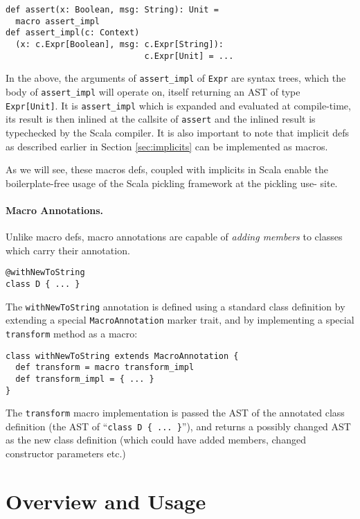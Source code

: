 \documentclass[preprint,10pt]{sigplanconf}
\theoremstyle{definition}
\begin{document}
\begin{lstlisting}
def assert(x: Boolean, msg: String): Unit =
  macro assert_impl
def assert_impl(c: Context)
  (x: c.Expr[Boolean], msg: c.Expr[String]):
                            c.Expr[Unit] = ...
\end{lstlisting}

In the above, the arguments of \verb|assert_impl| of \verb|Expr| are syntax
trees, which the body of \verb|assert_impl| will operate on, itself returning
an AST of type \verb|Expr[Unit]|. It is \verb|assert_impl| which is
expanded and evaluated at compile-time, its result is then inlined at the
callsite of \verb|assert| and the inlined result is typechecked by the Scala
compiler. It is also important to note that implicit defs as described earlier
in Section \ref{sec:implicits} can be implemented as macros.

As we will see, these macros defs, coupled with implicits in Scala enable the
boilerplate-free usage of the Scala pickling framework at the pickling use-
site.

\paragraph{Macro Annotations.} Unlike macro defs, macro annotations are capable
of {\em adding members} to classes which carry their annotation.

\begin{lstlisting}
@withNewToString
class D { ... }
\end{lstlisting}

The \verb|withNewToString| annotation is defined using a standard class
definition by extending a special \verb|MacroAnnotation| marker trait, and by
implementing a special \verb|transform| method as a macro:

\begin{lstlisting}
class withNewToString extends MacroAnnotation {
  def transform = macro transform_impl
  def transform_impl = { ... }
}
\end{lstlisting}

The \verb|transform| macro implementation is passed the AST of the annotated class
definition (the AST of ``\verb|class D { ... }|''), and returns a possibly changed AST
as the new class definition (which could have added members, changed
constructor parameters etc.)

\section{Overview and Usage}
\label{sec:overview}
\end{document}
